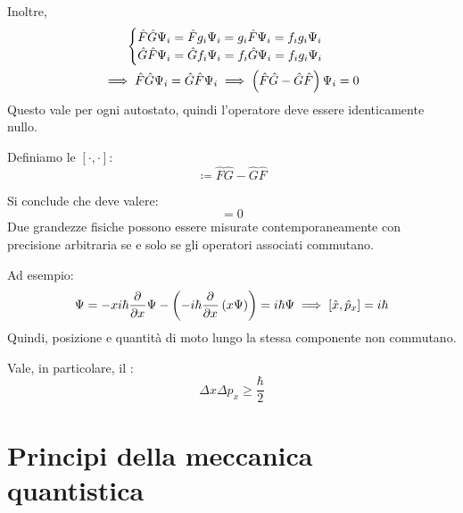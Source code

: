 Inoltre,
\begin{gather}
    \begin{cases}
        \hat{F} \hat{G} \Psi_i = \hat{F} g_i \Psi_i = g_i \hat{F} \Psi_i = f_i g_i \Psi_i \\
        \hat{G} \hat{F} \Psi_i = \hat{G} f_i \Psi_i = f_i \hat{G} \Psi_i = f_i g_i \Psi_i
    \end{cases} \\
    \implies
    \hat{F} \hat{G} \Psi_i = \hat{G} \hat{F} \Psi_i
    \implies \left( \hat{F} \hat{G} - \hat{G} \hat{F} \right) \Psi_i = 0
\end{gather}
Questo vale per ogni autostato, quindi l'operatore deve essere identicamente nullo.

Definiamo le  $[\cdot, \cdot]$:
\begin{equation}
    [\hat{F}, \hat{G}] \coloneq \hat{F} \hat{G} - \hat{G} \hat{F}
\end{equation}

Si conclude che deve valere:
\begin{equation}
    [\hat{F}, \hat{G}] = 0
\end{equation}
Due grandezze fisiche possono essere misurate contemporaneamente con precisione arbitraria se e solo se gli operatori associati commutano.

Ad esempio:
\begin{gather}
    [\hat{x}, \hat{p}_x] \Psi = - x \im \hbar \parder{x} \Psi - \pts{-\im \hbar \parder{x} \pts{x \Psi}} = \im \hbar \Psi
    \implies [\hat{x}, \hat{p}_x] = \im \hbar
\end{gather}
Quindi, posizione e quantità di moto lungo la stessa componente non commutano.

Vale, in particolare, il :
\begin{equation}
    \Delta x \Delta p_x \ge \frac{\hbar}{2}
\end{equation}



\section{Principi della meccanica quantistica}

